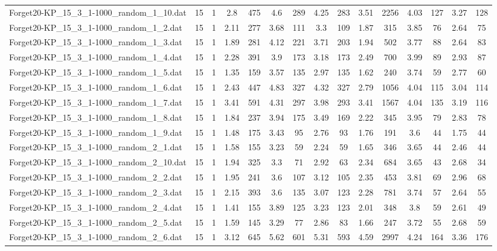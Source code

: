 \begin{table}[!ht]
{\begin{tabular}{lcccccccccccccc}
Forget20-KP\_15\_3\_1-1000\_random\_1\_10.dat & 15 & 1 & 2.8 & 475 & 4.6 & 289 & 4.25 & 283 & 3.51 & 2256 & 4.03 & 127 & 3.27 & 128 \\
Forget20-KP\_15\_3\_1-1000\_random\_1\_2.dat & 15 & 1 & 2.11 & 277 & 3.68 & 111 & 3.3 & 109 & 1.87 & 315 & 3.85 & 76 & 2.64 & 75 \\
Forget20-KP\_15\_3\_1-1000\_random\_1\_3.dat & 15 & 1 & 1.89 & 281 & 4.12 & 221 & 3.71 & 203 & 1.94 & 502 & 3.77 & 88 & 2.64 & 83 \\
Forget20-KP\_15\_3\_1-1000\_random\_1\_4.dat & 15 & 1 & 2.28 & 391 & 3.9 & 173 & 3.18 & 173 & 2.49 & 700 & 3.99 & 89 & 2.93 & 87 \\
Forget20-KP\_15\_3\_1-1000\_random\_1\_5.dat & 15 & 1 & 1.35 & 159 & 3.57 & 135 & 2.97 & 135 & 1.62 & 240 & 3.74 & 59 & 2.77 & 60 \\
Forget20-KP\_15\_3\_1-1000\_random\_1\_6.dat & 15 & 1 & 2.43 & 447 & 4.83 & 327 & 4.32 & 327 & 2.79 & 1056 & 4.04 & 115 & 3.04 & 114 \\
Forget20-KP\_15\_3\_1-1000\_random\_1\_7.dat & 15 & 1 & 3.41 & 591 & 4.31 & 297 & 3.98 & 293 & 3.41 & 1567 & 4.04 & 135 & 3.19 & 116 \\
Forget20-KP\_15\_3\_1-1000\_random\_1\_8.dat & 15 & 1 & 1.84 & 237 & 3.94 & 175 & 3.49 & 169 & 2.22 & 345 & 3.95 & 79 & 2.83 & 78 \\
Forget20-KP\_15\_3\_1-1000\_random\_1\_9.dat & 15 & 1 & 1.48 & 175 & 3.43 & 95 & 2.76 & 93 & 1.76 & 191 & 3.6 & 44 & 1.75 & 44 \\
Forget20-KP\_15\_3\_1-1000\_random\_2\_1.dat & 15 & 1 & 1.58 & 155 & 3.23 & 59 & 2.24 & 59 & 1.65 & 346 & 3.65 & 44 & 2.46 & 44 \\
Forget20-KP\_15\_3\_1-1000\_random\_2\_10.dat & 15 & 1 & 1.94 & 325 & 3.3 & 71 & 2.92 & 63 & 2.34 & 684 & 3.65 & 43 & 2.68 & 34 \\
Forget20-KP\_15\_3\_1-1000\_random\_2\_2.dat & 15 & 1 & 1.95 & 241 & 3.6 & 107 & 3.12 & 105 & 2.35 & 453 & 3.81 & 69 & 2.96 & 68 \\
Forget20-KP\_15\_3\_1-1000\_random\_2\_3.dat & 15 & 1 & 2.15 & 393 & 3.6 & 135 & 3.07 & 123 & 2.28 & 781 & 3.74 & 57 & 2.64 & 55 \\
Forget20-KP\_15\_3\_1-1000\_random\_2\_4.dat & 15 & 1 & 1.41 & 155 & 3.89 & 125 & 3.23 & 123 & 2.01 & 348 & 3.8 & 59 & 2.61 & 49 \\
Forget20-KP\_15\_3\_1-1000\_random\_2\_5.dat & 15 & 1 & 1.59 & 145 & 3.29 & 77 & 2.86 & 83 & 1.66 & 247 & 3.72 & 55 & 2.68 & 59 \\
Forget20-KP\_15\_3\_1-1000\_random\_2\_6.dat & 15 & 1 & 3.12 & 645 & 5.62 & 601 & 5.31 & 593 & 4.59 & 2997 & 4.24 & 164 & 3.36 & 176 \\

\end{tabular}}
\end{table}
